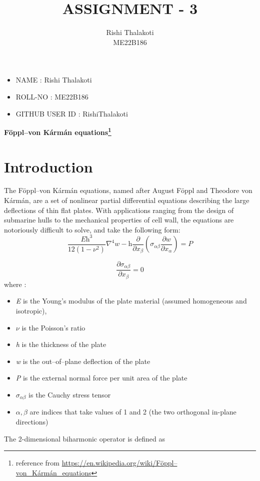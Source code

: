 \title{\textbf{ASSIGNMENT - 3}}
\author{Rishi Thalakoti \\ME22B186}

\begin{itemize}
    \item NAME : Rishi Thalakoti
    \item ROLL-NO : ME22B186
    \item GITHUB USER ID : RishiThalakoti
\end{itemize}
\textbf{\LARGE Föppl–von Kármán equations\footnote{reference from \url{https://en.wikipedia.org/wiki/Föppl–von_Kármán_equations}}}
\section*{Introduction}
The Föppl–von Kármán equations, named after August Föppl and Theodore von Kármán, are a set of nonlinear partial differential equations describing the large deflections of thin flat plates. With applications ranging from the design of submarine hulls to the mechanical properties of cell wall, the equations are notoriously difficult to solve, and take the following form:
\begin{equation}
 \frac{\textit{E}\textit{h}^3}{12(1-\nu^2)}\nabla^4w - \textit{h}\frac{\partial}{\partial x_\beta}\left(\sigma_{\alpha\beta}\frac{\partial w}{\partial x_{\alpha}}\right) = P  
\end{equation}

\begin{equation}
\frac{\partial\sigma_{\alpha\beta}}{\partial x_\beta} = 0
\end{equation}
where :
\begin{itemize}
    \item\textit{E} is the Young's modulus of the plate material (assumed homogeneous and isotropic),
    \item$\nu$ is the Poisson's ratio
    \item\textit{h} is the thickness of the plate
    \item\textit{w} is the out–of–plane deflection of the plate
    \item\textit{P} is the external normal force per unit area of the plate
    \item$\sigma_{\alpha\beta}$  is the Cauchy stress tensor
    \item $\alpha, \beta$ are indices that take values of 1 and 2 (the two orthogonal in-plane directions)
\end{itemize}
The 2-dimensional biharmonic operator is defined as

